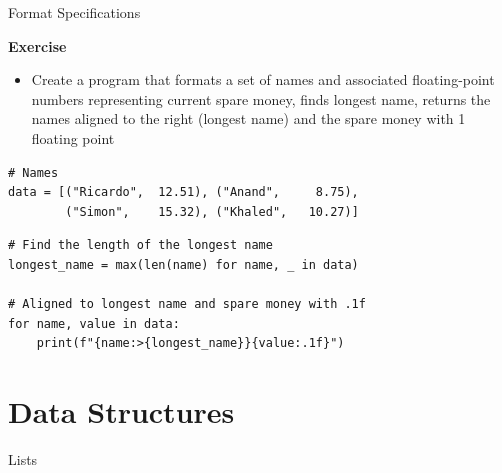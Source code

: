 \documentclass[
	11pt, 
]{beamer}
\begin{document}

\begin{frame}[fragile]{Format Specifications}

\begin{alertblock}{\textbf{Exercise}}
\begin{itemize}
    \item Create a program that formats a set of names and associated floating-point numbers representing current spare money, finds longest name, returns the names aligned to the right (longest name) and the spare money with 1 floating point
\end{itemize}
\begin{verbatim} 
# Names
data = [("Ricardo",  12.51), ("Anand",     8.75),
        ("Simon",    15.32), ("Khaled",   10.27)]
\end{verbatim}
\end{alertblock}
\pause
\begin{verbatim}
# Find the length of the longest name
longest_name = max(len(name) for name, _ in data)

# Aligned to longest name and spare money with .1f
for name, value in data:
    print(f"{name:>{longest_name}}{value:.1f}")
\end{verbatim}
\end{frame}


\section{Data Structures}
\begin{frame}[fragile]{Lists}




\end{frame}

\end{document}
